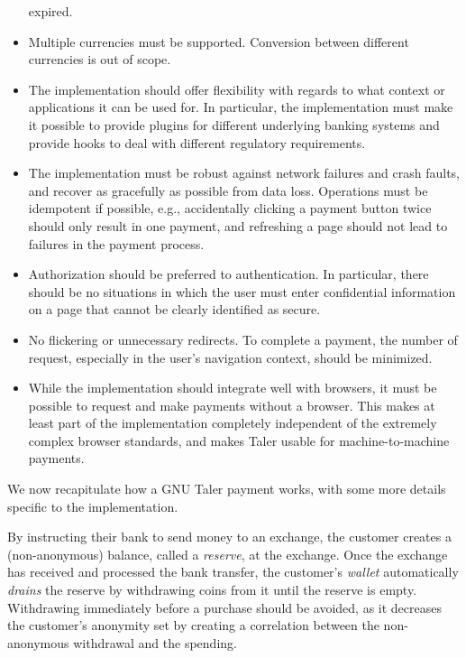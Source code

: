 \begin{itemize}
    expired.
  \item Multiple currencies must be supported.  Conversion between
    different currencies is out of scope.
  \item The implementation should offer flexibility with regards to what
    context or applications it can be used for.  In particular, the
    implementation must make it possible to provide plugins for different
    underlying banking systems and provide hooks to deal with different
    regulatory requirements.
  \item The implementation must be robust against network failures and crash
    faults, and recover as gracefully as possible from data loss.  Operations
    must be idempotent if possible, e.g., accidentally clicking a payment button twice should
    only result in one payment, and refreshing a page should not lead to
    failures in the payment process.
  \item Authorization should be preferred to authentication.  In particular,
    there should be no situations in which the user must enter confidential
    information on a page that cannot be clearly identified as secure.
  \item No flickering or unnecessary redirects.  To complete a payment, the
    number of request, especially in the user's navigation context, should be
    minimized.
  \item While the implementation should integrate well with browsers, it must
    be possible to request and make payments without a browser.  This makes at
    least part of the implementation completely independent of the extremely
    complex browser standards, and makes Taler usable for machine-to-machine
    payments.
\end{itemize}

We now recapitulate how a GNU Taler payment works, with some more details
specific to the implementation.

By instructing their bank to send money to an exchange, the customer creates a
(non-anonymous) balance, called a \emph{reserve}, at the exchange.  Once the
exchange has received and processed the bank transfer, the customer's
\emph{wallet} automatically \emph{drains} the reserve by withdrawing coins from
it until the reserve is empty.  Withdrawing immediately before a purchase should
be avoided, as it decreases the customer's anonymity set by creating a
correlation between the non-anonymous withdrawal and the spending.

